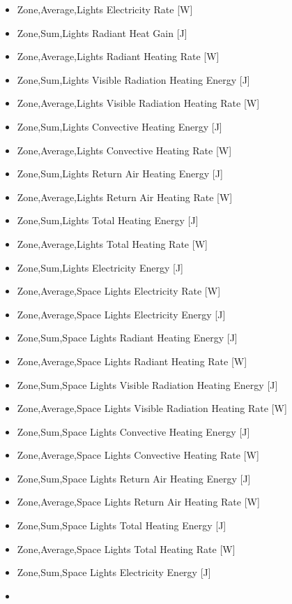 \begin{itemize}
\item
  Zone,Average,Lights Electricity Rate {[}W{]}
\item
  Zone,Sum,Lights Radiant Heat Gain {[}J{]}
\item
  Zone,Average,Lights Radiant Heating Rate {[}W{]}
\item
  Zone,Sum,Lights Visible Radiation Heating Energy {[}J{]}
\item
  Zone,Average,Lights Visible Radiation Heating Rate {[}W{]}
\item
  Zone,Sum,Lights Convective Heating Energy {[}J{]}
\item
  Zone,Average,Lights Convective Heating Rate {[}W{]}
\item
  Zone,Sum,Lights Return Air Heating Energy {[}J{]}
\item
  Zone,Average,Lights Return Air Heating Rate {[}W{]}
\item
  Zone,Sum,Lights Total Heating Energy {[}J{]}
\item
  Zone,Average,Lights Total Heating Rate {[}W{]}
\item
  Zone,Sum,Lights Electricity Energy {[}J{]}
\item
  Zone,Average,Space Lights Electricity Rate {[}W{]}
\item
  Zone,Average,Space Lights Electricity Energy {[}J{]}
\item
  Zone,Sum,Space Lights Radiant Heating Energy {[}J{]}
\item
  Zone,Average,Space Lights Radiant Heating Rate {[}W{]}
\item
  Zone,Sum,Space Lights Visible Radiation Heating Energy {[}J{]}
\item
  Zone,Average,Space Lights Visible Radiation Heating Rate {[}W{]}
\item
  Zone,Sum,Space Lights Convective Heating Energy {[}J{]}
\item
  Zone,Average,Space Lights Convective Heating Rate {[}W{]}
\item
  Zone,Sum,Space Lights Return Air Heating Energy {[}J{]}
\item
  Zone,Average,Space Lights Return Air Heating Rate {[}W{]}
\item
  Zone,Sum,Space Lights Total Heating Energy {[}J{]}
\item
  Zone,Average,Space Lights Total Heating Rate {[}W{]}
\item
  Zone,Sum,Space Lights Electricity Energy {[}J{]}
\item

\end{itemize}
